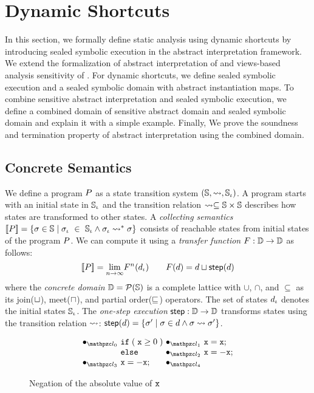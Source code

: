 \section{Dynamic Shortcuts}\label{sec:formal}
In this section, we formally define static analysis using dynamic shortcuts by
introducing sealed symbolic execution in the abstract interpretation framework.
We extend the formalization of abstract interpretation of \citet{abs-interp-1977,
abs-interp-1992} and views-based analysis sensitivity of \citet{sens-toplas}.
For dynamic shortcuts, we define sealed symbolic execution and  a
sealed symbolic domain with abstract instantiation maps.  To combine
sensitive abstract interpretation and sealed symbolic execution, we define
a combined domain of sensitive abstract domain and sealed symbolic domain and
explain it with a simple example. Finally, We prove the soundness and
termination property of abstract interpretation using the combined domain.


\subsection{Concrete Semantics}

We define a program $P$ as a state transition system $(\mathbb{S}, \leadsto,
\mathbb{S}_\iota)$.  A program starts with an initial state in $\mathbb{S}_\iota$ and the
transition relation $\leadsto \subseteq \mathbb{S} \times \mathbb{S}$ describes how states
are transformed to other states.  A \textit{collecting semantics} $[\![{P}]\!] =
\{ \sigma \in \mathbb{S} \mid \sigma_\iota~\in~\mathbb{S}_\iota \wedge \sigma_\iota \leadsto^* \sigma \}$ consists of
reachable states from initial states of the program $P$.  We can compute
it using a \textit{transfer function} $F: \mathbb{D} \rightarrow \mathbb{D}$ as
follows:
\[
  [\![{P}]\!] = \underset{n \rightarrow \infty}{\lim}{F^n(d_\iota)}\\
  \qquad
  F(d) = d \sqcup \textsf{step}(d)\\
\]
where the \textit{concrete domain} $\mathbb{D} = \mathcal{P}(\mathbb{S})$ is a complete lattice
with $\cup$, $\cap$, and $\subseteq$ as its join($\sqcup$), meet($\sqcap$), and
partial order($\sqsubseteq$) operators.  The set of states $d_\iota$ denotes the
initial states $\mathbb{S}_\iota$.  The \textit{one-step execution} $\textsf{step}: \mathbb{D}
\rightarrow \mathbb{D}$ transforms states using the transition relation $\leadsto$:
$\textsf{step}(d) = \{ \sigma' \mid \sigma \in d \wedge \sigma \leadsto \sigma' \}$.

\begin{figure}[t]
  \[
    \begin{array}{r@{~}l@{~}c@{~}l}
      \labdot{0} & \kwif \; (\; \varx \geq 0 \;) & \labdot{1} & \varx = \varx ;\\
                 & \kwelse & \labdot{2} & \varx = -\varx ;\\
      \labdot{3} & \varx = -\varx ; & \labdot{4} \\
    \end{array}
  \]
  \vspace*{-1em}
  \caption{Negation of the absolute value of $\texttt{x}$}
  \label{fig:running-example}
\end{figure}

